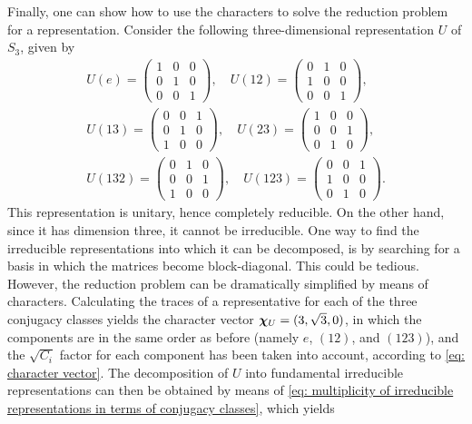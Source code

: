 \begin{ex}
    Finally, one can show how to use the characters to solve the reduction problem for a representation. Consider the following three-dimensional representation $U$ of $S_3$, given by
    \begin{gather}
        U(e) = 
        \begin{pmatrix} 
            1 & 0 & 0 \\
            0 & 1 & 0 \\
            0 & 0 & 1 
        \end{pmatrix}, \quad U(12) = 
        \begin{pmatrix} 
            0 & 1 & 0 \\
            1 & 0 & 0 \\
            0 & 0 & 1 
        \end{pmatrix}, \\
        U(13) = 
        \begin{pmatrix}
            0 & 0 & 1 \\
            0 & 1 & 0 \\
            1 & 0 & 0 
        \end{pmatrix}, 
        \quad U(23) = 
        \begin{pmatrix} 
            1 & 0 & 0 \\
            0 & 0 & 1 \\
            0 & 1 & 0 
        \end{pmatrix}, \\
        U(132) = 
        \begin{pmatrix} 
            0 & 1 & 0 \\
            0 & 0 & 1 \\
            1 & 0 & 0 
        \end{pmatrix}, \quad U(123) = 
        \begin{pmatrix}
            0 & 0 & 1 \\
            1 & 0 & 0 \\
            0 & 1 & 0 
        \end{pmatrix}.
    \end{gather}
    This representation is unitary, hence completely reducible. On the other hand, since it has dimension three, it cannot be irreducible. One way to find the irreducible representations into which it can be decomposed, is by searching for a basis in which the matrices become block-diagonal. This could be tedious. However, the reduction problem can be dramatically simplified by means of characters. Calculating the traces of a representative for each of the three conjugacy classes yields the character vector $\bm{\chi}_U = (3, \sqrt{3}, 0)$, in which the components are in the same order as before (namely $e$, $(12)$, and $(123)$), and the $\sqrt{C_i}$ factor for each component has been taken into account, according to \eqref{eq: character vector}. The decomposition of $U$ into fundamental irreducible representations can then be obtained by means of \eqref{eq: multiplicity of irreducible representations in terms of conjugacy classes}, which yields

\end{ex}
